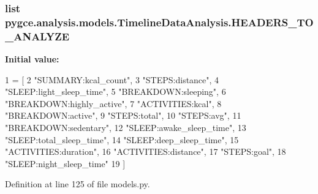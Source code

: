 \subsubsection[{\texorpdfstring{H\+E\+A\+D\+E\+R\+S\+\_\+\+T\+O\+\_\+\+A\+N\+A\+L\+Y\+ZE}{HEADERS_TO_ANALYZE}}]{\setlength{\rightskip}{0pt plus 5cm}list pygce.\+analysis.\+models.\+Timeline\+Data\+Analysis.\+H\+E\+A\+D\+E\+R\+S\+\_\+\+T\+O\+\_\+\+A\+N\+A\+L\+Y\+ZE\hspace{0.3cm}{\ttfamily [static]}}\hypertarget{classpygce_1_1analysis_1_1models_1_1_timeline_data_analysis_abc835b2b9b9d8555a2b49e8534782021}{}\label{classpygce_1_1analysis_1_1models_1_1_timeline_data_analysis_abc835b2b9b9d8555a2b49e8534782021}
{\bfseries Initial value\+:}
\begin{DoxyCode}
1 = [
2         \textcolor{stringliteral}{"SUMMARY:kcal\_count"},
3         \textcolor{stringliteral}{"STEPS:distance"},
4         \textcolor{stringliteral}{"SLEEP:light\_sleep\_time"},
5         \textcolor{stringliteral}{"BREAKDOWN:sleeping"},
6         \textcolor{stringliteral}{"BREAKDOWN:highly\_active"},
7         \textcolor{stringliteral}{"ACTIVITIES:kcal"},
8         \textcolor{stringliteral}{"BREAKDOWN:active"},
9         \textcolor{stringliteral}{"STEPS:total"},
10         \textcolor{stringliteral}{"STEPS:avg"},
11         \textcolor{stringliteral}{"BREAKDOWN:sedentary"},
12         \textcolor{stringliteral}{"SLEEP:awake\_sleep\_time"},
13         \textcolor{stringliteral}{"SLEEP:total\_sleep\_time"},
14         \textcolor{stringliteral}{"SLEEP:deep\_sleep\_time"},
15         \textcolor{stringliteral}{"ACTIVITIES:duration"},
16         \textcolor{stringliteral}{"ACTIVITIES:distance"},
17         \textcolor{stringliteral}{"STEPS:goal"},
18         \textcolor{stringliteral}{"SLEEP:night\_sleep\_time"}
19     ]
\end{DoxyCode}


Definition at line 125 of file models.\+py.

